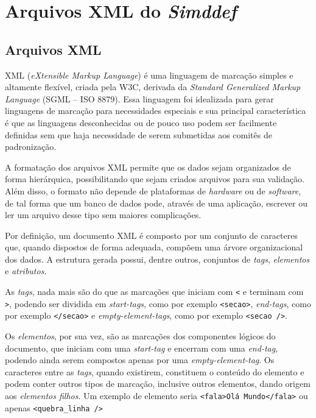 \chapter{Arquivos XML do \textbf{\textit{Simddef}}}
\label{ap:formatacao_xml}

\section{Arquivos XML}
XML ({\it eXtensible Markup Language}) é uma linguagem de marcação simples e
altamente flexível, criada pela W3C, derivada da {\it Standard Generalized
Markup Language} (SGML -- ISO 8879). Essa linguagem foi idealizada para gerar
linguagens de marcação para necessidades especiais e sua principal
característica é que as linguagens desconhecidas ou de pouco uso podem ser
facilmente definidas sem que haja necessidade de serem submetidas aos comitês de
padronização.

A formatação dos arquivos XML permite que os dados sejam organizados de forma
hierárquica, possibilitando que sejam criados arquivos para sua validação. Além
disso, o formato não depende de plataformas de {\it hardware} ou de {\it
software}, de tal forma que um banco de dados pode, através de uma aplicação,
escrever ou ler um arquivo desse tipo sem maiores complicações.

Por definição, um documento XML é composto por um conjunto de caracteres que,
quando dispostos de forma adequada, compõem uma árvore organizacional dos dados.
A estrutura gerada possui, dentre outros, conjuntos de {\it tags}, {\it
elementos} e {\it atributos}.

As {\it tags}, nada mais são do que as marcações que iniciam com \verb|<| e
terminam com \verb|>|, podendo ser dividida em {\it start-tags}, como por
exemplo \verb|<secao>|, {\it end-tags}, como por exemplo \verb|</secao>| e {\it
empty-element-tags}, como por exemplo \verb|<secao />|.

Os {\it elementos}, por sua vez, são as marcações dos componentes lógicos do
documento, que iniciam com uma {\it start-tag} e encerram com uma {\it end-tag},
podendo ainda serem compostos apenas por uma {\it empty-element-tag}. Os
caracteres entre as {\it tags}, quando existirem, constituem o conteúdo do
elemento e podem conter outros tipos de marcação, inclusive outros elementos,
dando origem aos {\it elementos filhos}. Um exemplo de elemento seria
\verb|<fala>Olá Mundo</fala>| ou apenas \verb|<quebra_linha />|

